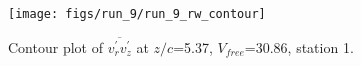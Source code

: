 \begin{figure}[H]
\centering
\texttt{[image: figs/run\_9/run\_9\_rw\_contour]}
\caption{Contour plot of $\overline{v_{r}^{\prime} v_{z}^{\prime}}$ at $z/c$=5.37, $V_{free}$=30.86, station 1.}
\label{fig:run_9_rw_contour}
\end{figure}



